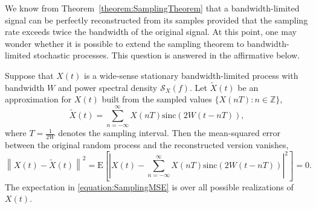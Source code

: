 We know from Theorem~\ref{theorem:SamplingTheorem} that a bandwidth-limited signal can be perfectly reconstructed from its samples provided that the sampling rate exceeds twice the bandwidth of the original signal.
At this point, one may wonder whether it is possible to extend the sampling theorem to bandwidth-limited stochastic processes.
This question is answered in the affirmative below.

\begin{theorem} \label{theorem:SamplingRandomSignals}
Suppose that $X(t)$ is a wide-sense stationary bandwidth-limited process with bandwidth $W$ and power spectral density $\mathcal{S}_X (f)$.
Let $\tilde{X}(t)$ be an approximation for $X(t)$ built from the sampled values $\{ X(nT) : n \in \mathbb{Z} \}$,
\begin{equation*}
\tilde{X}(t) = \sum_{n=-\infty}^{\infty} X(nT) \mathrm{sinc} (2 W (t - nT)) ,
\end{equation*}
where $T = \frac{1}{2W}$ denotes the sampling interval.
Then the mean-squared error between the original random process and the reconstructed version vanishes,
\begin{equation} \label{equation:SamplingMSE}
\left\| X(t) - \tilde{X}(t) \right\|^2
= \mathrm{E} \left[ \left| X(t) - \sum_{n=-\infty}^{\infty}
X(nT) \mathrm{sinc} (2 W (t - nT)) \right|^2 \right] = 0 .
\end{equation}
The expectation in \eqref{equation:SamplingMSE} is over all possible realizations of $X(t)$.
\end{theorem}
